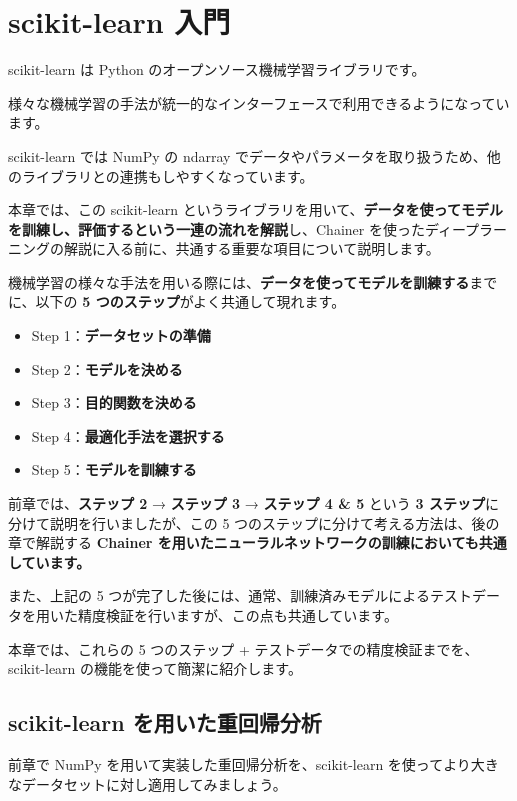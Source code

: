 \chapter{scikit-learn 入門}


scikit-learn は Python のオープンソース機械学習ライブラリです。

様々な機械学習の手法が統一的なインターフェースで利用できるようになっています。

scikit-learn では NumPy の ndarray でデータやパラメータを取り扱うため、他のライブラリとの連携もしやすくなっています。


本章では、この scikit-learn というライブラリを用いて、\textbf{データを使ってモデルを訓練し、評価するという一連の流れを解説}し、Chainer を使ったディープラーニングの解説に入る前に、共通する重要な項目について説明します。


機械学習の様々な手法を用いる際には、\textbf{データを使ってモデルを訓練する}までに、以下の \textbf{5 つのステップ}がよく共通して現れます。


\begin{itemize}
\item Step 1：\textbf{データセットの準備}
\item Step 2：\textbf{モデルを決める}
\item Step 3：\textbf{目的関数を決める}
\item Step 4：\textbf{最適化手法を選択する}
\item Step 5：\textbf{モデルを訓練する}
\end{itemize}


前章では、\textbf{ステップ 2} → \textbf{ステップ 3} → \textbf{ステップ 4 \& 5} という \textbf{3 ステップ}に分けて説明を行いましたが、この 5 つのステップに分けて考える方法は、後の章で解説する \textbf{Chainer を用いたニューラルネットワークの訓練においても共通しています。}

また、上記の 5 つが完了した後には、通常、訓練済みモデルによるテストデータを用いた精度検証を行いますが、この点も共通しています。


本章では、これらの 5 つのステップ + テストデータでの精度検証までを、scikit-learn の機能を使って簡潔に紹介します。


\section{scikit-learn を用いた重回帰分析}


前章で NumPy を用いて実装した重回帰分析を、scikit-learn を使ってより大きなデータセットに対し適用してみましょう。


